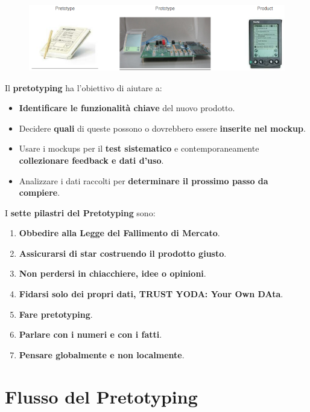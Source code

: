 \documentclass[a4paper,11pt,oneside]{book}
\begin{document}
\pagebreak

\begin{figure}[!h]
	\centering
	\includegraphics[scale=0.65]{immagini/Pre_prot.png}
\end{figure}

Il \textbf{pretotyping} ha l'obiettivo di aiutare a:

\begin{itemize}
	\item \textbf{Identificare le funzionalità chiave} del nuovo prodotto.
	\item Decidere \textbf{quali} di queste possono o dovrebbero essere \textbf{inserite nel mockup}.
	\item Usare i mockups per il \textbf{test sistematico} e contemporaneamente \textbf{collezionare feedback e dati d'uso}.
	\item Analizzare i dati raccolti per \textbf{determinare il prossimo passo da compiere}.
\end{itemize}

I \textbf{sette pilastri del Pretotyping} sono:

\begin{enumerate}
	\item \textbf{Obbedire alla Legge del Fallimento di Mercato}.
	\item \textbf{Assicurarsi di star costruendo il prodotto giusto}.
	\item \textbf{Non perdersi in chiacchiere, idee o opinioni}.
	\item \textbf{Fidarsi solo dei propri dati, \textbf{TRUST YODA: Your Own DAta}}.
	\item \textbf{Fare pretotyping}.
	\item \textbf{Parlare con i numeri e con i fatti}.
	\item \textbf{Pensare globalmente e non localmente}.
\end{enumerate}

\section{Flusso del Pretotyping}
\end{document}
